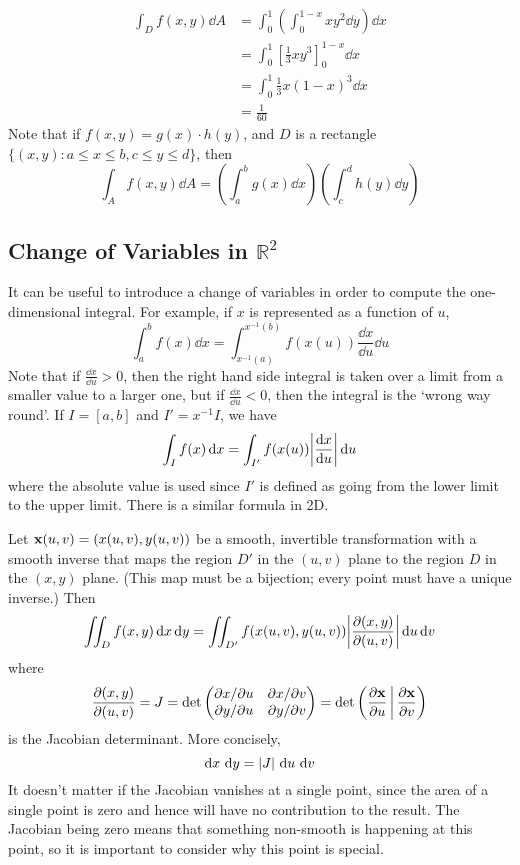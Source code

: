 \documentclass{article}
\begin{document}
\begin{align*}
    \int_D f(x, y) \dd{A} & = \int_0^1 \left( \int_0^{1-x} xy^2 \dd{y} \right) \dd{x} \\
                          & = \int_0^1 \left[ \frac{1}{3} xy^3 \right]_0^{1-x} \dd{x} \\
                          & = \int_0^1 \frac{1}{3} x(1-x)^3 \dd{x}                    \\
                          & = \frac{1}{60}
\end{align*}
Note that if $f(x, y) = g(x) \cdot h(y)$, and $D$ is a rectangle $\{ (x, y) \colon a \leq x \leq b, c \leq y \leq d \}$, then
\[ \int_A f(x, y) \dd{A} = \left( \int_a^b g(x) \dd{x} \right)\left( \int_c^d h(y) \dd{y} \right) \]

\subsection{Change of Variables in $\mathbb R^2$}
It can be useful to introduce a change of variables in order to compute the one-dimensional integral. For example, if $x$ is represented as a function of $u$,
\[ \int_a^b f(x) \dd{x} = \int_{x^{-1}(a)}^{x^{-1}(b)} f(x(u)) \frac{\dd{x}}{\dd{u}}\dd{u} \]
Note that if $\frac{\dd{x}}{\dd{u}} > 0$, then the right hand side integral is taken over a limit from a smaller value to a larger one, but if $\frac{\dd{x}}{\dd{u}} < 0$, then the integral is the `wrong way round'. If $I = [a,b]$ and $I' = x^{-1} I$, we have
\[ \int_I f(x) \dd{x} = \int_{I'} f(x(u)) \abs{\frac{\dd{x}}{\dd{u}}} \dd{u} \]
where the absolute value is used since $I'$ is defined as going from the lower limit to the upper limit. There is a similar formula in 2D.
\begin{proposition}
    Let $\vb x(u, v) = (x(u, v), y(u, v))$ be a smooth, invertible transformation with a smooth inverse that maps the region $D'$ in the $(u, v)$ plane to the region $D$ in the $(x, y)$ plane. (This map must be a bijection; every point must have a unique inverse.) Then
    \[ \iint_D f(x, y) \dd{x} \dd{y} = \iint_{D'} f(x(u, v), y(u, v)) \abs{\frac{\partial (x, y)}{\partial (u, v)}}\dd{u} \dd{v} \]
    where
    \[ \frac{\partial (x, y)}{\partial (u, v)} = J = \det \begin{pmatrix}
            \partial x / \partial u & \partial x / \partial v \\
            \partial y / \partial u & \partial y / \partial v
        \end{pmatrix} = \det \left( \frac{\partial \vb x}{\partial u} \,\middle|\, \frac{\partial \vb x}{\partial v} \right) \]
    is the Jacobian determinant. More concisely,
    \[ \dd{x} \, \dd{y} = \abs{J} \, \dd{u} \, \dd{v} \]
    It doesn't matter if the Jacobian vanishes at a single point, since the area of a single point is zero and hence will have no contribution to the result. The Jacobian being zero means that something non-smooth is happening at this point, so it is important to consider why this point is special.
\end{proposition}
\end{document}
